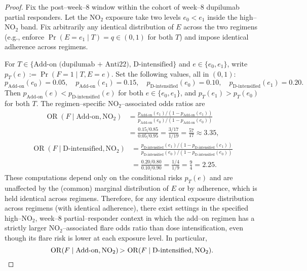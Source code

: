 \begin{proof}
Fix the post--week--8 window within the cohort of week--8 dupilumab partial responders. Let the NO$_2$ exposure take two levels $e_0 < e_1$ inside the high--NO$_2$ band. Fix arbitrarily any identical distribution of $E$ across the two regimens (e.g., enforce $\Pr(E=e_1\mid T)=q\in(0,1)$ for both $T$) and impose identical adherence across regimens.

For $T\in\{\text{Add-on (dupilumab + Anti22)},\,\text{D-intensified}\}$ and $e\in\{e_0,e_1\}$, write $p_T(e) := \Pr(F=1\mid T, E=e)$. Set the following values, all in $(0,1)$:
\[
 p_{\mathrm{Add\text{-}on}}(e_0)=0.05,\quad p_{\mathrm{Add\text{-}on}}(e_1)=0.15,\quad p_{\mathrm{D\text{-}intensified}}(e_0)=0.10,\quad p_{\mathrm{D\text{-}intensified}}(e_1)=0.20.
\]
Then $p_{\mathrm{Add\text{-}on}}(e)<p_{\mathrm{D\text{-}intensified}}(e)$ for both $e\in\{e_0,e_1\}$, and $p_T(e_1)>p_T(e_0)$ for both $T$. The regimen--specific NO$_2$--associated odds ratios are
\[
\begin{aligned}
\operatorname{OR}(F\mid \text{Add-on}, \mathrm{NO}_2)
&= \frac{p_{\mathrm{Add\text{-}on}}(e_1)/(1-p_{\mathrm{Add\text{-}on}}(e_1))}{p_{\mathrm{Add\text{-}on}}(e_0)/(1-p_{\mathrm{Add\text{-}on}}(e_0))}\\
&= \frac{0.15/0.85}{0.05/0.95} = \frac{3/17}{1/19} = \frac{57}{17} \approx 3.35,
\end{aligned}
\]
\[
\begin{aligned}
\operatorname{OR}(F\mid \text{D-intensified}, \mathrm{NO}_2)
&= \frac{p_{\mathrm{D\text{-}intensified}}(e_1)/(1-p_{\mathrm{D\text{-}intensified}}(e_1))}{p_{\mathrm{D\text{-}intensified}}(e_0)/(1-p_{\mathrm{D\text{-}intensified}}(e_0))}\\
&= \frac{0.20/0.80}{0.10/0.90} = \frac{1/4}{1/9} = \frac{9}{4} = 2.25.
\end{aligned}
\]
These computations depend only on the conditional risks $p_T(e)$ and are unaffected by the (common) marginal distribution of $E$ or by adherence, which is held identical across regimens. Therefore, for any identical exposure distribution across regimens (with identical adherence), there exist settings in the specified high--NO$_2$, week--8 partial--responder context in which the add--on regimen has a strictly larger NO$_2$--associated flare odds ratio than dose intensification, even though its flare risk is lower at each exposure level. In particular,
\[
\operatorname{OR}(F\mid \text{Add-on}, \mathrm{NO}_2) \,{>}\, \operatorname{OR}(F\mid \text{D-intensified}, \mathrm{NO}_2).\qedhere
\]
\end{proof}
